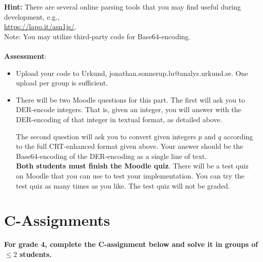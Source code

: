 \documentclass{article}
\begin{document}
\begin{description}
{				\textbf{Hint:} There are several online parsing tools that you may find useful during development, e.g.,\\ 
				\url{https://lapo.it/asn1js/}.\\
				Note: You may utilize third-party code for Base64-encoding.\\\\
				
				\textbf{Assessment}:
				\begin{itemize}
					\item Upload your code to Urkund, jonathan.sonnerup.lu@analys.urkund.se.
					One upload per group is sufficient.
					\item There will be two Moodle questions for this part. The first will ask you to DER-encode integers. That is, given an integer, you will answer with the DER-encoding of that integer in textual format, as detailed above.
					
					The second question will ask you to convert given integers $p$ and $q$ according to the full CRT-enhanced format given above. Your answer should be the Base64-encoding of the DER-encoding as a single line of text.\\
					\textbf{Both students must finish the Moodle quiz}.
					There will be a test quiz on Moodle that you can use to test your implementation. You can try the test quiz as many times as you like. The test quiz will not be graded.
					
				\end{itemize}
			}
		\end{description}

		\clearpage
		
		\section*{C-Assignments}
		\textbf{For grade 4, complete the C-assignment below and solve it in groups of $\leq 2$ students.}
		
\end{document}
